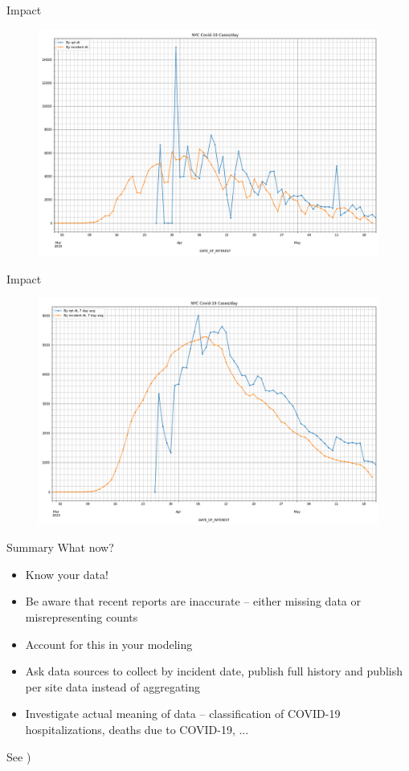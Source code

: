 \documentclass[aspectratio=169]{beamer}
\begin{document}
\begin{frame}{Impact}
  \begin{figure}
    \centering
    \includegraphics[height=.8\textheight]{../Notebooks/casesPerDayHistoryRptDtVsInDtRaw.png}
  \end{figure}
\end{frame}

\begin{frame}{Impact}
  \begin{figure}
    \centering
    \includegraphics[height=.8\textheight]{../Notebooks/casesPerDayHistoryRptDtVsInDt.png}
  \end{figure}
\end{frame}

\begin{frame}{Summary}
  What now?
  \begin{itemize}
  \item Know your data!
  \item Be aware that recent reports are inaccurate -- either missing
    data or misrepresenting counts
  \item Account for this in your modeling
  \item Ask data sources to collect by incident date, publish full
    history and publish per site data instead of aggregating
  \item Investigate actual meaning of data -- classification of COVID-19
    hospitalizations, deaths due to COVID-19, ...
  \end{itemize}

  See ) 
\end{frame}
\end{document}
